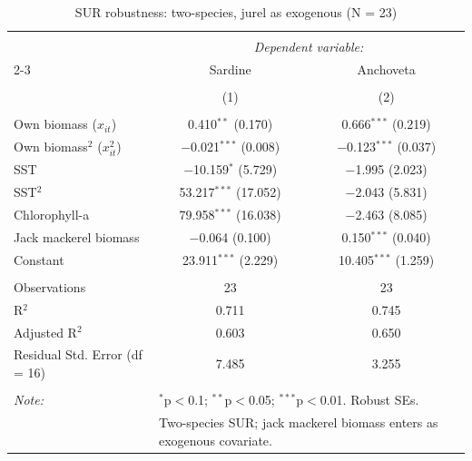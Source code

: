 \documentclass[
  11pt,
]{article}
\begin{document}
\begin{table}[!htbp] \centering 
  \caption{SUR robustness: two-species, jurel as exogenous (N = 23)} 
  \label{tab:SUR_rob_2sp} 
\footnotesize 
\begin{tabular}{@{\extracolsep{5pt}}lcc} 
\\[-1.8ex]\hline 
\hline \\[-1.8ex] 
 & \multicolumn{2}{c}{\textit{Dependent variable:}} \\ 
\cline{2-3} 
 & Sardine & Anchoveta \\ 
\\[-1.8ex] & (1) & (2)\\ 
\hline \\[-1.8ex] 
 Own biomass ($x_{it}$) & 0.410$^{**}$ (0.170) & 0.666$^{***}$ (0.219) \\ 
  Own biomass$^2$ ($x_{it}^2$) & $-$0.021$^{***}$ (0.008) & $-$0.123$^{***}$ (0.037) \\ 
  SST & $-$10.159$^{*}$ (5.729) & $-$1.995 (2.023) \\ 
  SST$^2$ & 53.217$^{***}$ (17.052) & $-$2.043 (5.831) \\ 
  Chlorophyll-a & 79.958$^{***}$ (16.038) & $-$2.463 (8.085) \\ 
  Jack mackerel biomass & $-$0.064 (0.100) & 0.150$^{***}$ (0.040) \\ 
  Constant & 23.911$^{***}$ (2.229) & 10.405$^{***}$ (1.259) \\ 
 \hline \\[-1.8ex] 
Observations & 23 & 23 \\ 
R$^{2}$ & 0.711 & 0.745 \\ 
Adjusted R$^{2}$ & 0.603 & 0.650 \\ 
Residual Std. Error (df = 16) & 7.485 & 3.255 \\ 
\hline 
\hline \\[-1.8ex] 
\textit{Note:}  & \multicolumn{2}{l}{$^{*}$p$<$0.1; $^{**}$p$<$0.05; $^{***}$p$<$0.01. Robust SEs.} \\ 
 & \multicolumn{2}{l}{Two-species SUR; jack mackerel biomass enters as exogenous covariate.} \\ 
\end{tabular} 
\end{table}
\end{document}
